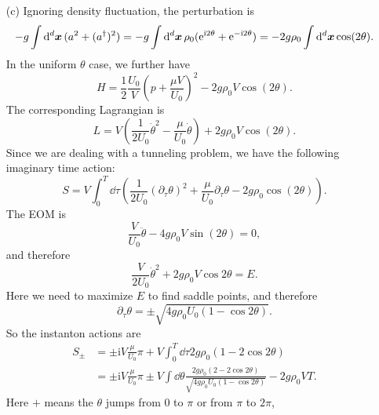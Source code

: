 \documentclass[hyperref, a4paper]{article}
\newcommand*{\ii}{\mathrm{i}}
\newcommand*{\ee}{\mathrm{e}}
\begin{document}
\begin{itemize}
\item[(c)] Ignoring density fluctuation,
the perturbation is 
\begin{equation}
    - g \int \dd[d]{\vb*{x}} (a^2 + (a^\dagger)^2) = 
    - g \int \dd[d]{\vb*{x}} \rho_0 (\ee^{\ii 2 \theta} + \ee^{- \ii 2 \theta})
    = - 2 g \rho_0 \int \dd[d]{\vb*{x}} \cos(2 \theta).
\end{equation}
In the uniform $\theta$ case, we further have 
\begin{equation}
    H = \frac{1}{2} \frac{U_0}{V} \left( p + \frac{\mu V}{U_0} \right)^2
    - 2 g \rho_0 V \cos(2 \theta).
\end{equation}
The corresponding Lagrangian is 
\begin{equation}
    L=V\left(\frac{1}{2 U_0} \dot{\theta}^2-\frac{\mu}{U_0} \dot{\theta}\right)
    + 2 g \rho_0 V \cos(2 \theta).
\end{equation}
Since we are dealing with a tunneling problem, we have the following imaginary time action:
\begin{equation}
    S = V \int_0^{T} \dd{\tau}
    \left( 
        \frac{1}{2U_0} (\partial_\tau \theta)^2 
        + \frac{\mu}{U_0} \partial_\tau \theta 
        - 2 g \rho_0 \cos(2\theta) \right) .
\end{equation}
The EOM is 
\begin{equation}
    \frac{V}{U_0} \ddot{\theta} - 4 g \rho_0 V \sin(2\theta) = 0,
    \label{eq:imaginary-eom-well}
\end{equation}
and therefore 
\begin{equation}
    \frac{V}{2U_0} \dot{\theta}^2 + 2g \rho_0 V \cos 2 \theta = E.
\end{equation}
Here we need to maximize $E$ to find saddle points,
and therefore 
\begin{equation}
    \partial_\tau \theta = \pm \sqrt{ 4 g \rho_0 U_0 (1 - \cos 2 \theta) }.
\end{equation}
So the instanton actions are 
\begin{equation}
    \begin{aligned}
        S_\pm &= \pm \ii V \frac{\mu}{U_0} \pi + V \int_0^T \dd{\tau} 2 g \rho_0 (1 - 2 \cos 2\theta)  \\
        &= \pm \ii V \frac{\mu}{U_0} \pi 
        \pm V \int \dd{\theta} 
        \frac{2 g \rho_0 (2 - 2 \cos 2\theta)}{\sqrt{ 4 g \rho_0 U_0 (1 - \cos 2 \theta) }} 
        - 2 g \rho_0 V T .
    \end{aligned}
\end{equation}
Here $+$ means the $\theta$ jumps from $0$ to $\pi$ or from $\pi$ to $2\pi$,

\end{itemize}
\end{document}
